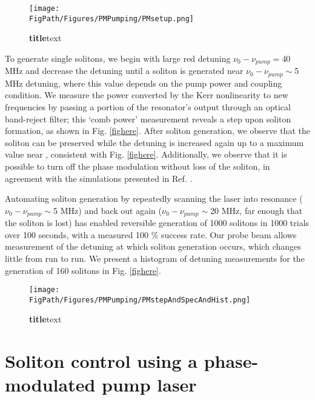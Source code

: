 \begin{figure}[htpb]
	\begin{center}
		\texttt{[image: \\FigPath/Figures/PMPumping/PMsetup.png]}
	\end{center}
	\caption[Figure Title]{\textbf{title}text}
	\label{fig:PMsetup}
\end{figure} 


To generate single solitons, we begin with large red detuning $\nu_0-\nu_{pump}=$40 MHz and decrease the detuning until a soliton is generated near $\nu_0-\nu_{pump}\sim$5 MHz detuning, where this value depends on the pump power and coupling condition. We measure the power converted by the Kerr nonlinearity to new frequencies by passing a portion of the resonator's output through an optical band-reject filter; this `comb power' measurement reveals a step upon soliton formation, as shown in Fig. \ref{fighere}. After soliton generation, we observe that the soliton can be preserved while the detuning is increased again up to a maximum value near , consistent with Fig. \ref{fighere}. Additionally, we observe that it is possible to turn off the phase modulation without loss of the soliton, in agreement with the simulations presented in Ref. \cite{Taheri2015}.

Automating soliton generation by repeatedly scanning the laser into resonance ($\nu_0-\nu_{pump}\sim$5 MHz) and back out again ($\nu_0-\nu_{pump}\sim$20 MHz, far enough that the soliton is lost) has enabled reversible generation of 1000 solitons in 1000 trials over 100 seconds, with a measured 100 $\%$ success rate. Our probe beam allows measurement of the detuning at which soliton generation occurs, which changes little from run to run. We present a histogram of detuning measurements for the generation of 160 solitons in Fig. \ref{fighere}. 

\begin{figure}[htpb]
	\begin{center}
		\texttt{[image: \\FigPath/Figures/PMPumping/PMstepAndSpecAndHist.png]}
	\end{center}
	\caption[Figure Title]{\textbf{title}text}
	\label{fig:PMstepAndSpecAndHist}
\end{figure} 

\section{Soliton control using a phase-modulated pump laser}

